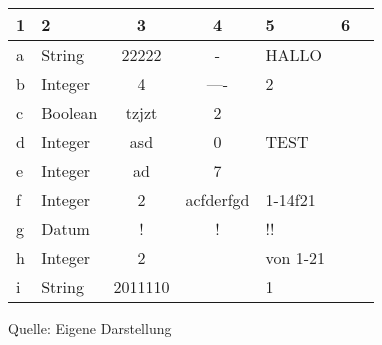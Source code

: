 
\begin{center}
\begin{tabular}[c]{|l|l|c|c|l|l|l}
  \hline
    \textbf{1} & \textbf{2} & \textbf{3} & \textbf{4} &
    \textbf{5} & \textbf{6}\\
  \hline
    a & String & 22222 & - & HALLO & \\
  \hline
    b & Integer & 4 & ---- & 2  & \\
  \hline
    c & Boolean & tzjzt & 2 &  & \\
  \hline
    d & Integer & asd & 0 & TEST & \\
  \hline
    e & Integer & ad & 7 &  & \\
  \hline
    f & Integer & 2 & acfderfgd & 1-14f21 & \\
  \hline
    g & Datum & ! & ! & !! & \\
  \hline
    h & Integer & 2 &  & von 1-21 & \\
  \hline
    i & String & 2011110 &  & 1 & \\
  \hline
\end{tabular}
Quelle: Eigene Darstellung
\end{center}